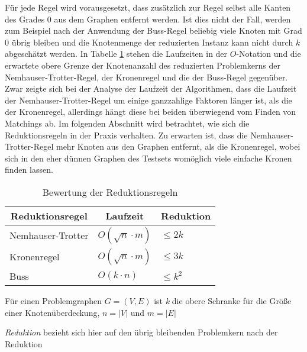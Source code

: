 Für jede Regel wird vorausgesetzt, dass zusätzlich zur Regel selbst alle Kanten des Grades 0 aus dem Graphen entfernt werden. Ist dies nicht der Fall, werden zum Beispiel nach der Anwendung der Buss-Regel beliebig viele Knoten mit Grad 0 übrig bleiben und die Knotenmenge der reduzierten Instanz kann nicht durch $k$ abgeschätzt werden.
In Tabelle \ref{tab:liste} stehen die Laufzeiten in der $O$-Notation und die erwartete obere Grenze der Knotenanzahl des reduzierten Problemkerns der Nemhauser-Trotter-Regel, der Kronenregel und die der Buss-Regel gegenüber. Zwar zeigte sich bei der Analyse der Laufzeit der Algorithmen, dass die Laufzeit der Nemhauser-Trotter-Regel um einige ganzzahlige Faktoren länger ist, als die der Kronenregel, allerdings hängt diese bei beiden überwiegend vom Finden von Matchings ab. 
Im folgenden Abschnitt wird betrachtet, wie sich die Reduktionsregeln in der Praxis verhalten. Zu erwarten ist, dass die Nemhauser-Trotter-Regel mehr Knoten aus den Graphen entfernt, als die Kronenregel, wobei sich in den eher dünnen Graphen des Testsets womöglich viele einfache Kronen finden lassen. 

\begin{table}[htb]
\caption{Bewertung der Reduktionsregeln\label{tab:liste}}
\vspace*{1em}
\centering
\bgroup
\def\arraystretch{1.3}%

\begin{threeparttable}

\begin{tabular}[c]{lll}
	\hline
	\multicolumn{1}{c}{\textbf{Reduktionsregel}} & 
	\multicolumn{1}{c}{\textbf{Laufzeit}} & 
	\multicolumn{1}{c}{\textbf{Reduktion}} \\ 
	
	\hline

	Nemhauser-Trotter&$O(\sqrt{n} \cdot m)$&  $\leq 2k$\\
	Kronenregel&$O(\sqrt{n} \cdot m)$ & $\leq 3k$\\
	Buss&$O(k \cdot n)$  & $\leq k^{2}$\\
	\hline
\end{tabular}

\begin{tablenotes}\footnotesize
\item Für einen Problemgraphen $G=(V,E)$ ist \emph{k} die obere Schranke für die Größe einer Knotenüberdeckung, $n=|V|$ und $m=|E|$
\item \emph{Reduktion} bezieht sich hier auf den übrig bleibenden Problemkern nach der Reduktion
\end{tablenotes}

\end{threeparttable}

\egroup

\end{table}

